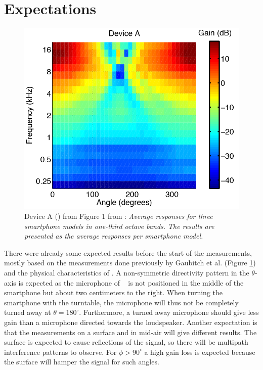 \section{Expectations}
\label{sec:ms-expectations}
\begin{figure}
        \centering
		\includegraphics[]{afbeeldingen/device_a.png}
	    \caption[Device A from \cite{Gaubitch2014}]{Device A (\nexus) from Figure 1 from \cite{Gaubitch2014}: \textit{Average responses for three smartphone models in one-third octave bands. The results are presented as the average responses per smartphone model.}}
	    \label{fig:Gaubitch}
\end{figure}
There were already some expected results before the start of the measurements, mostly based on the measurements done previously by Gaubitch et al. \cite{Gaubitch2014} (Figure \ref{fig:Gaubitch}) and the physical characteristics of \nexus.
A non-symmetric directivity pattern in the $\theta$-axis is expected as the microphone of \nexus~ is not positioned in the middle of the smartphone but about two centimeters to the right. 
When turning the smartphone with the turntable, the microphone will thus not be completely turned away at $\theta=180^\circ$.
Furthermore, a turned away microphone should give less gain than a microphone directed towards the loudspeaker. 
Another expectation is that the measurements on a surface and in mid-air will give different results.
The surface is expected to cause reflections of the signal, so there will be multipath interference patterns to observe. For $\phi>90^\circ$ a high gain loss is expected because the surface will hamper the signal for such angles.  

